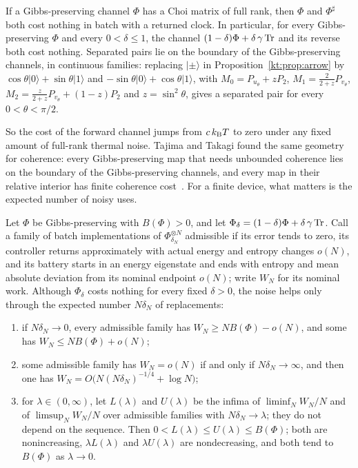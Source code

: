 \begin{proposition}\label{kt:prop:generic}
If a Gibbs-preserving channel $\Phi$ has a Choi matrix of full rank, then $\Phi$ and $\Phi^\sharp$ both cost nothing in batch with a returned clock. In particular, for every Gibbs-preserving $\Phi$ and every $0<\delta\le1$, the channel $(1-\delta)\Phi+\delta\,\gamma\operatorname{Tr}$ and its reverse both cost nothing. Separated pairs lie on the boundary of the Gibbs-preserving channels, in continuous families: replacing $|\pm\rangle$ in Proposition~\ref{kt:prop:arrow} by $\cos\theta|0\rangle+\sin\theta|1\rangle$ and $-\sin\theta|0\rangle+\cos\theta|1\rangle$, with $M_0=P_{u_\theta}+zP_2$, $M_1=\tfrac2{2+z}P_{v_\theta}$, $M_2=\tfrac{z}{2+z}P_{v_\theta}+(1-z)P_2$ and $z=\sin^2\theta$, gives a separated pair for every $0<\theta<\pi/2$.
\end{proposition}

So the cost of the forward channel jumps from $c\,k_{\mathrm B} T$ to zero under any fixed amount of full-rank thermal noise. Tajima and Takagi found the same geometry for coherence: every Gibbs-preserving map that needs unbounded coherence lies on the boundary of the Gibbs-preserving channels, and every map in their relative interior has finite coherence cost~\cite{TajimaTakagi25}. For a finite device, what matters is the expected number of noisy uses.

\begin{proposition}\label{kt:prop:noise-horizon}
Let $\Phi$ be Gibbs-preserving with $B(\Phi)>0$, and let $\Phi_\delta=(1-\delta)\Phi+\delta\,\gamma\operatorname{Tr}$. Call a family of batch implementations of $\Phi_{\delta_N}^{\otimes N}$ admissible if its error tends to zero, its controller returns approximately with actual energy and entropy changes $o(N)$, and its battery starts in an energy eigenstate and ends with entropy and mean absolute deviation from its nominal endpoint $o(N)$; write $W_N$ for its nominal work. Although $\Phi_\delta$ costs nothing for every fixed $\delta>0$, the noise helps only through the expected number $N\delta_N$ of replacements:
\begin{enumerate}[label=(\alph*)]
\item if $N\delta_N\to0$, every admissible family has $W_N\ge NB(\Phi)-o(N)$, and some has $W_N\le NB(\Phi)+o(N)$;
\item some admissible family has $W_N=o(N)$ if and only if $N\delta_N\to\infty$, and then one has $W_N=O\bigl(N(N\delta_N)^{-1/4}+\log N\bigr)$;
\item for $\lambda\in(0,\infty)$, let $L(\lambda)$ and $U(\lambda)$ be the infima of $\liminf_NW_N/N$ and of $\limsup_NW_N/N$ over admissible families with $N\delta_N\to\lambda$; they do not depend on the sequence. Then $0<L(\lambda)\le U(\lambda)\le B(\Phi)$; both are nonincreasing, $\lambda L(\lambda)$ and $\lambda U(\lambda)$ are nondecreasing, and both tend to $B(\Phi)$ as $\lambda\to0$.
\end{enumerate}
\end{proposition}

